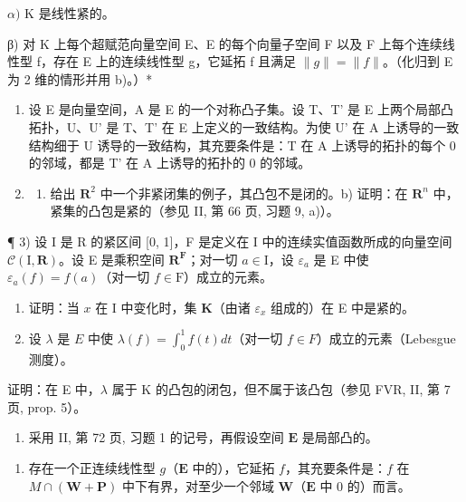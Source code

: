 \(\alpha)\) K 是线性紧的。

β) 对 K 上每个超赋范向量空间 E、E 的每个向量子空间 F 以及 F 上每个连续线性型 f，存在 E 上的连续线性型 g，它延拓 f 且满足 \(\|g\| = \|f\|\)。（化归到 E 为 2 维的情形并用 b)。）*

\exercisegroup

\begin{enumerate}
\def\labelenumi{\arabic{enumi})}
\item
  设 E 是向量空间，A 是 E 的一个对称凸子集。设 T、T' 是 E 上两个局部凸拓扑，U、U' 是 T、T' 在 E 上定义的一致结构。为使 U' 在 A 上诱导的一致结构细于 U 诱导的一致结构，其充要条件是：T 在 A 上诱导的拓扑的每个 0 的邻域，都是 T' 在 A 上诱导的拓扑的 0 的邻域。
\item
  \begin{enumerate}
  \def\labelenumii{\alph{enumii})}
  \tightlist
  \item
    给出 \(\mathbf{R}^2\) 中一个非紧闭集的例子，其凸包不是闭的。b) 证明：在 \(\mathbf{R}^n\) 中，紧集的凸包是紧的（参见 II, 第 66 页, 习题 9, a)）。
  \end{enumerate}
\end{enumerate}

¶ 3) 设 I 是 R 的紧区间 {[}0, 1{]}，F 是定义在 I 中的连续实值函数所成的向量空间 \(\mathcal{C}(\mathrm{I},\mathbf{R})\)。设 E 是乘积空间 \(\mathbf{R}^{\mathbf{F}}\)；对一切 \(a\in\mathrm{I}\)，设 \(\varepsilon_{a}\) 是 E 中使 \(\varepsilon_{a}(f)=f(a)\)（对一切 \(f\in\mathrm{F}\)）成立的元素。

\begin{enumerate}
\def\labelenumi{\alph{enumi})}
\item
  证明：当 \(x\) 在 I 中变化时，集 \(\mathbf{K}\)（由诸 \(\varepsilon_x\) 组成的）在 E 中是紧的。
\item
  设 \(\lambda\) 是 \(E\) 中使 \(\lambda(f) = \int_0^1 f(t)dt\)（对一切 \(f\in F\)）成立的元素（Lebesgue 测度）。
\end{enumerate}

证明：在 E 中，\(\lambda\) 属于 K 的凸包的闭包，但不属于该凸包（参见 FVR, II, 第 7 页, prop. 5）。

\begin{enumerate}
\def\labelenumi{\arabic{enumi})}
\setcounter{enumi}{3}
\tightlist
\item
  采用 II, 第 72 页, 习题 1 的记号，再假设空间 \(\mathbf{E}\) 是局部凸的。
\end{enumerate}

\begin{enumerate}
\def\labelenumi{\alph{enumi})}
\item
  存在一个正连续线性型 \(g\)（\(\mathbf{E}\) 中的），它延拓 \(f\)，其充要条件是：\(f\) 在 \(M \cap (\mathbf{W} + \mathbf{P})\) 中下有界，对至少一个邻域 \(\mathbf{W}\)（\(\mathbf{E}\) 中 0 的）而言。
\end{enumerate}

